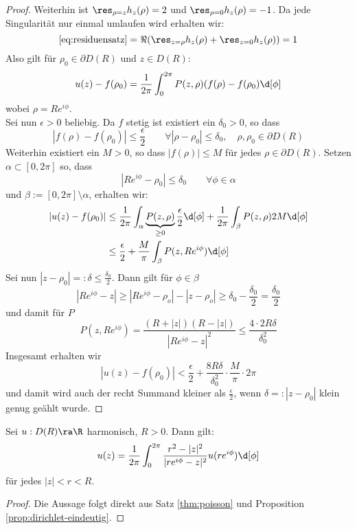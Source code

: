 \begin{proof}
  Weiterhin ist $\res_{\rho = z} h_z(\rho) = 2$ und $\res_{\rho=0}
  h_z(\rho) = -1$. Da jede Singularität nur einmal umlaufen wird
  erhalten wir:
  \[
  \eqref{eq:residuensatz} = \Re(\res_{z = \rho}h_z(\rho) + \res_{z =
    0} h_z(\rho)) = 1
  \]
  Also gilt für $\rho_0 \in \partial D(R)$ und $z \in D(R)$:
  \[
  u(z) - f(\rho_0) = \frac{1}{2\pi} \int_0^{2\pi} P(z, \rho) (f (\rho)
  - f(\rho_0) \d[\phi]
  \]
  wobei $\rho = Re^{i\phi}$. \\
  Sei nun $\epsilon > 0$ beliebig. Da $f$ stetig ist existiert ein
  $\delta_0 > 0$, so dass
  \[
  |f(\rho) - f(\rho_0)| \leq \frac{\epsilon}{2} \qquad \forall |\rho -
  \rho_0| \leq \delta_0, \quad \rho, \rho_0 \in \partial D(R)
  \]
  Weiterhin existiert ein $M > 0$, so dass $|f(\rho)| \leq M$ für
  jedes $\rho \in \partial D(R)$. Setzen $\alpha \subset [0, 2\pi]$
  so, dass
  \[
  |R e^{i\phi} - \rho_0| \leq \delta_0 \qquad \forall \phi \in \alpha
  \]
  und $\beta := [0, 2\pi]\setminus \alpha$, erhalten wir:
  \begin{align*}
    |u(z) - f(\rho_0)| & \leq \frac{1}{2\pi} \int_\alpha
    \underbrace{P(z, \rho)}_{\geq 0} \frac{\epsilon}{2} \d[\phi] +
    \frac{1}{2\pi} \int_\beta P(z, \rho) 2 M \d[\phi] \\
    & \leq \frac{\epsilon}{2} + \frac{M}{\pi} \int_\beta P(z,
    Re^{i\phi}) \d[\phi]
  \end{align*}
  Sei nun $|z - \rho_0| =: \delta \leq \frac{\delta_0}{2}$. Dann gilt
  für $\phi \in \beta$
  \[
  |Re^{i\phi} - z| \geq |Re^{i\phi} - \rho_o| - |z - \rho_o| \geq
  \delta_0 - \frac{\delta_0}{2} = \frac{\delta_0}{2}
  \]
  und damit für $P$
  \[
  P(z, Re^{i\phi}) = \frac{(R+ |z|)(R - |z|)}{|Re^{i\phi} - z|^2} \leq
  \frac{4 \cdot 2 R \delta}{\delta_0^2}
  \]
  Insgesamt erhalten wir
  \[
  |u(z) - f(\rho_0)| < \frac{\epsilon}{2} + \frac{8 R
    \delta}{\delta_0^2} \cdot \frac{M}{\pi} \cdot 2\pi
  \]
  und damit wird auch der recht Summand kleiner als
  $\frac{\epsilon}{2}$, wenn $\delta =: |z - \rho_0|$ klein genug
  geählt wurde.
\end{proof}

\begin{cor}
  \label{cor:harm-darstellung}
  Sei $u: D(R) \ra \R$ harmonisch, $ R > 0$. Dann gilt:
  \[
  u(z) = \frac{1}{2\pi} \int_0^{2\pi} \frac{r^2 - |z|^2}{|re^{i\phi} -
    z|^2} u(re^{i\phi}) \d[\phi]
  \]
  für jedes $|z|<r<R$.
\end{cor}

\begin{proof}
  Die Aussage folgt direkt aus Satz \ref{thm:poisson} und Proposition \ref{prop:dirichlet-eindeutig}.
\end{proof}

